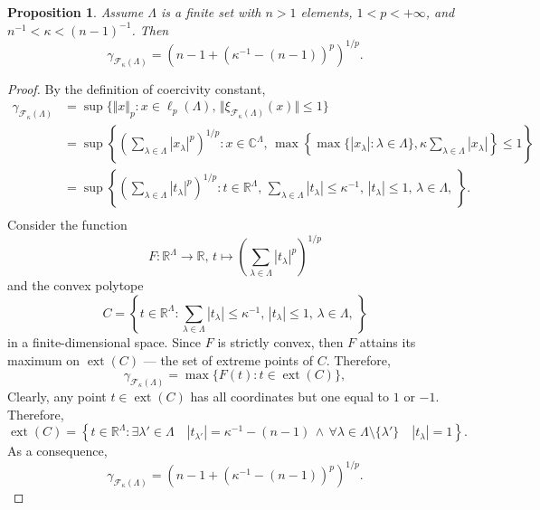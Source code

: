 \documentclass[12pt]{article}
\newtheorem{proposition}[theorem]{Proposition}
\begin{document}
\begin{proposition}\label{StdEmbdSpclCoerciv}
    Assume $\Lambda$ is a finite set with $n>1$ elements, $1<p<+\infty$, 
    and $n^{-1}<\kappa<(n-1)^{-1}$. Then
    \[
        \gamma_{\mathcal{F}_{\kappa}(\Lambda)}
        =(n-1+(\kappa^{-1}-(n-1))^p)^{1/p}.
    \]
\end{proposition}
\begin{proof}
    By the definition of coercivity constant,
    \[
    \begin{aligned}
        \gamma_{\mathcal{F}_{\kappa}(\Lambda)}
        &=\sup\{
            \Vert x\Vert_p : 
            x\in\ell_p(\Lambda),\, 
            \Vert \xi_{\mathcal{F}_{\kappa}(\Lambda)}(x)\Vert\leq 1
        \} \\
        &=\sup\left\{
            \left( \sum_{\lambda\in\Lambda} |x_\lambda|^p\right)^{1/p} : 
            x\in\mathbb{C}^\Lambda,\, 
            \max\left\{
                \max\{|x_\lambda|:\lambda\in\Lambda\},
                \kappa\sum_{\lambda\in\Lambda} |x_\lambda|
            \right\}\leq 1
        \right\} \\
        &=\sup\left\{
            \left( \sum_{\lambda\in\Lambda} |t_\lambda|^p\right)^{1/p} : 
            t\in\mathbb{R}^\Lambda,\, 
            \sum_{\lambda\in\Lambda} |t_\lambda|\leq \kappa^{-1},\,
            |t_\lambda|\leq 1,\,\lambda\in\Lambda,\,
        \right\}. \\
    \end{aligned}
    \]
    Consider the function
    \[
        F:
        \mathbb{R}^\Lambda\to\mathbb{R},\, 
        t\mapsto \left(\sum_{\lambda\in\Lambda}|t_\lambda|^p\right)^{1/p}
    \]
    and the convex polytope
    \[
        C=\left\{ 
            t\in\mathbb{R}^\Lambda : 
            \sum_{\lambda\in\Lambda} |t_\lambda|\leq \kappa^{-1},\,
            |t_\lambda|\leq 1,\,\lambda\in\Lambda,\,
        \right\}
    \]
    in a finite-dimensional space. Since $F$ is strictly convex, then $F$ 
    attains its maximum on $\operatorname{ext}(C)$ --- the set of extreme 
    points of $C$. Therefore,
    \[
        \gamma_{\mathcal{F}_{\kappa}(\Lambda)}=\max\{
            F(t):t\in\operatorname{ext}(C)
        \},
    \]
    Clearly, any point $t\in \operatorname{ext}(C)$ has all coordinates but one
    equal to $1$ or $-1$. Therefore,
    \[
        \operatorname{ext}(C)=\left\{ 
            t\in\mathbb{R}^\Lambda : 
            \exists \lambda'\in\Lambda\quad |t_{\lambda'}|=\kappa^{-1}-(n-1)\,
            \wedge\, 
            \forall \lambda\in\Lambda\setminus\{\lambda'\}\quad |t_\lambda|=1
        \right\}.
    \]
    As a consequence,
    \[
        \gamma_{\mathcal{F}_{\kappa}(\Lambda)}=(n-1+(\kappa^{-1}-(n-1))^p)^{1/p}.
    \]
\end{proof}
\end{document}
